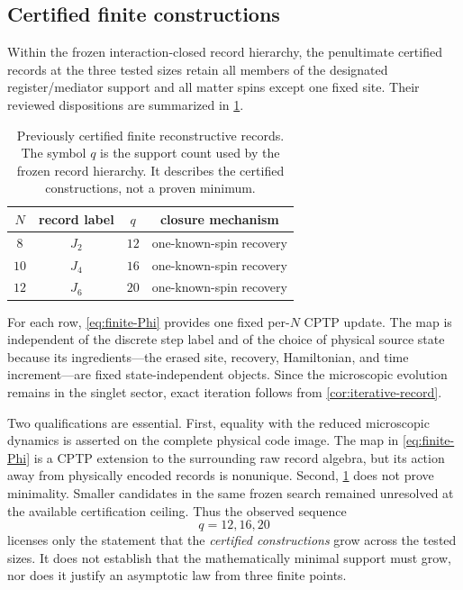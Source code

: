 \subsection{Certified finite constructions}

Within the frozen interaction-closed record hierarchy, the penultimate certified records at the three tested sizes retain all members of the designated register/mediator support and all matter spins except one fixed site.  Their reviewed dispositions are summarized in \cref{tab:finite-records}.

\begin{table}[htbp]
  \centering
  \caption{Previously certified finite reconstructive records.  The symbol $q$ is the support count used by the frozen record hierarchy.  It describes the certified constructions, not a proven minimum.}
  \label{tab:finite-records}
  \begin{tabular}{@{}cccc@{}}
    \toprule
    $N$ & record label & $q$ & closure mechanism \\
    \midrule
    $8$  & $J_2$ & $12$ & one-known-spin recovery \\
    $10$ & $J_4$ & $16$ & one-known-spin recovery \\
    $12$ & $J_6$ & $20$ & one-known-spin recovery \\
    \bottomrule
  \end{tabular}
\end{table}

For each row, \cref{eq:finite-Phi} provides one fixed per-$N$ CPTP update.  The map is independent of the discrete step label and of the choice of physical source state because its ingredients---the erased site, recovery, Hamiltonian, and time increment---are fixed state-independent objects.  Since the microscopic evolution remains in the singlet sector, exact iteration follows from \cref{cor:iterative-record}.

Two qualifications are essential.  First, equality with the reduced microscopic dynamics is asserted on the complete physical code image.  The map in \cref{eq:finite-Phi} is a CPTP extension to the surrounding raw record algebra, but its action away from physically encoded records is nonunique.  Second, \cref{tab:finite-records} does not prove minimality.  Smaller candidates in the same frozen search remained unresolved at the available certification ceiling.  Thus the observed sequence
\begin{equation}
  q=12,16,20
\end{equation}
licenses only the statement that the \emph{certified constructions} grow across the tested sizes.  It does not establish that the mathematically minimal support must grow, nor does it justify an asymptotic law from three finite points.

